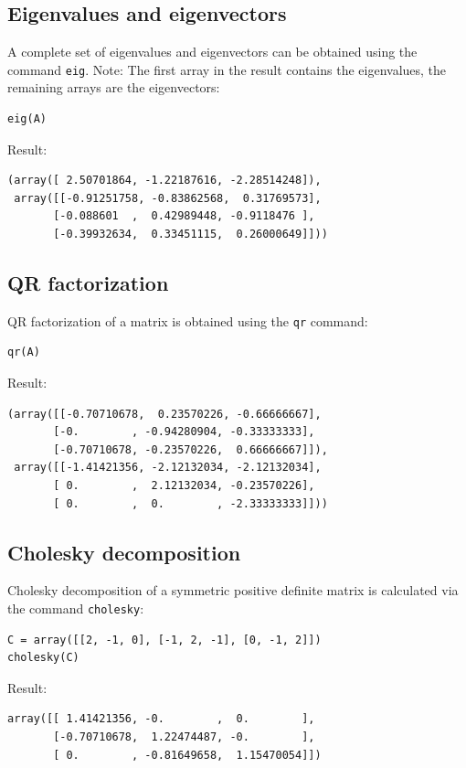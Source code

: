 \documentclass[article,A4,12pt]{llncs}
\begin{document}
\subsection{Eigenvalues and eigenvectors}

A complete set of eigenvalues and eigenvectors can be obtained using the command {\tt eig}.
Note: The first array in the result contains the eigenvalues, the remaining arrays are the
eigenvectors:
\begin{verbatim}
eig(A)
\end{verbatim}
Result:
\begin{verbatim}
(array([ 2.50701864, -1.22187616, -2.28514248]), 
 array([[-0.91251758, -0.83862568,  0.31769573],
       [-0.088601  ,  0.42989448, -0.9118476 ],
       [-0.39932634,  0.33451115,  0.26000649]]))
\end{verbatim}

\subsection{QR factorization}

QR factorization of a matrix is obtained using the {\tt qr} command:
\begin{verbatim}
qr(A)
\end{verbatim}
Result:
\begin{verbatim}
(array([[-0.70710678,  0.23570226, -0.66666667],
       [-0.        , -0.94280904, -0.33333333],
       [-0.70710678, -0.23570226,  0.66666667]]), 
 array([[-1.41421356, -2.12132034, -2.12132034],
       [ 0.        ,  2.12132034, -0.23570226],
       [ 0.        ,  0.        , -2.33333333]]))
\end{verbatim}

\subsection{Cholesky decomposition}

Cholesky decomposition of a symmetric positive definite matrix is 
calculated via the command {\tt cholesky}:
\begin{verbatim}
C = array([[2, -1, 0], [-1, 2, -1], [0, -1, 2]])
cholesky(C)
\end{verbatim}
Result:
\begin{verbatim}
array([[ 1.41421356, -0.        ,  0.        ],
       [-0.70710678,  1.22474487, -0.        ],
       [ 0.        , -0.81649658,  1.15470054]])
\end{verbatim}
\end{document}
